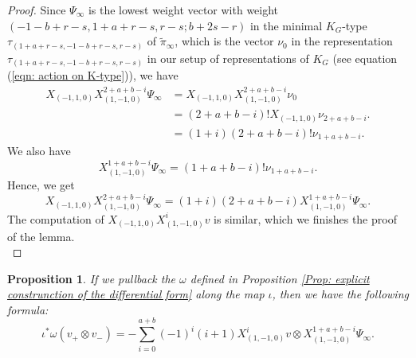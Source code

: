 \documentclass[11pt, a4paper]{amsart}
\theoremstyle{plain}
\newtheorem{proposition}[theorem]{Proposition}
\theoremstyle{definition}
\numberwithin{equation}{section}
\begin{document}
\begin{proof}
    Since $\Psi_{\infty}$ is the lowest weight vector with weight $(-1 - b + r - s, 1 + a + r - s, r - s; b + 2s -r)$ in the minimal $K_G$-type $\tau_{(1 + a + r -s, -1-b +r -s, r-s)}$ of $\tilde{\pi}_{\infty}$, which is the vector $\nu_{0}$ in the representation $\tau_{(1 + a + r -s, -1-b +r -s, r-s)} $ in our setup of representations of $K_{G}$ (see equation (\ref{eqn: action on K-type})), 
        we have 
        \begin{align*}
            X_{(-1, 1, 0)} X^{2 + a + b - i}_{(1, -1, 0)} \Psi_{\infty}  &= X_{(-1, 1, 0)} X^{2 + a + b - i}_{(1, -1, 0)} \nu_0 \\
            & = (2 + a + b - i)! X_{(-1, 1, 0)} \nu_{2 + a + b - i}. \\
            & = (1 + i)(2 + a + b - i)! \nu_{1 + a + b - i}. 
        \end{align*}
        We also have
        \begin{equation*}
            X^{1 + a + b - i}_{(1, -1, 0)} \Psi_{\infty}  = (1 + a + b - i)! \nu_{1 + a + b - i}. 
        \end{equation*}
        Hence, we get
        \begin{equation*}
            X_{(-1, 1, 0)} X^{2 + a + b - i}_{(1, -1, 0)} \Psi_{\infty}  = (1 + i)(2 + a + b - i) X^{1 + a + b - i}_{(1, -1, 0)} \Psi_{\infty}. 
        \end{equation*}
        The computation of $X_{(-1, 1, 0)} X_{(1, -1 ,0)}^{i} v$ is similar, which we finishes the proof of the lemma. \\
\end{proof}

\begin{proposition}
\label{Prop:pullback_form}
    If we pullback the $\omega$ defined in Proposition \ref{Prop: explicit construnction of the differential form} along the map $\iota$, then we have the following formula:
    \begin{equation*}
        \iota^{*}\omega(v_{+} \otimes v_{-}) = - \sum_{i = 0}^{a + b} (-1)^{i}(i + 1) X_{(1, -1 ,0)}^{i}v \otimes X^{1 + a + b - i}_{(1, -1 , 0)} \Psi_{\infty}. 
    \end{equation*}
\end{proposition}
\end{document}
